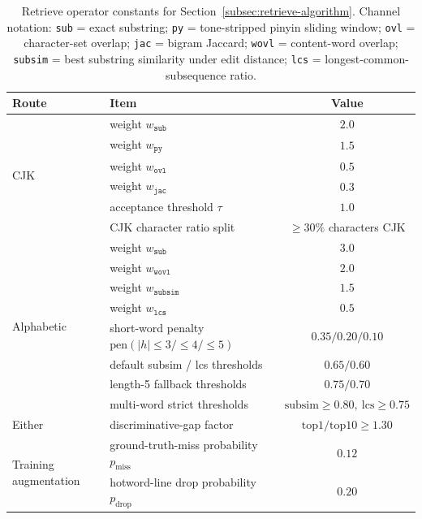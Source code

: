 \begin{table}[ht]
  \caption{Retrieve operator constants for
    Section~\ref{subsec:retrieve-algorithm}.
    Channel notation: \texttt{sub} = exact substring;
    \texttt{py} = tone-stripped pinyin sliding window;
    \texttt{ovl} = character-set overlap;
    \texttt{jac} = bigram Jaccard;
    \texttt{wovl} = content-word overlap;
    \texttt{subsim} = best substring similarity under edit distance;
    \texttt{lcs} = longest-common-subsequence ratio.}
  \label{tab:retrieve_constants}
  \centering
  \small
  \begin{tabular}{llc}
    \toprule
    Route & Item & Value \\
    \midrule
    \multirow{6}{*}{CJK}
       & weight $w_{\texttt{sub}}$            & $2.0$ \\
       & weight $w_{\texttt{py}}$             & $1.5$ \\
       & weight $w_{\texttt{ovl}}$            & $0.5$ \\
       & weight $w_{\texttt{jac}}$            & $0.3$ \\
       & acceptance threshold $\tau$          & $1.0$ \\
       & CJK character ratio split            & $\ge 30\%$ characters CJK \\
    \midrule
    \multirow{8}{*}{Alphabetic}
       & weight $w_{\texttt{sub}}$            & $3.0$ \\
       & weight $w_{\texttt{wovl}}$           & $2.0$ \\
       & weight $w_{\texttt{subsim}}$         & $1.5$ \\
       & weight $w_{\texttt{lcs}}$            & $0.5$ \\
       & short-word penalty $\mathrm{pen}(|h|\!\le\!3 / \le\!4 / \le\!5)$ & $0.35 / 0.20 / 0.10$ \\
       & default subsim / lcs thresholds       & $0.65 / 0.60$ \\
       & length-5 fallback thresholds          & $0.75 / 0.70$ \\
       & multi-word strict thresholds          & $\mathrm{subsim}\ge 0.80,\ \mathrm{lcs}\ge 0.75$ \\
    \midrule
    Either & discriminative-gap factor       & $\mathrm{top1}/\mathrm{top10} \ge 1.30$ \\
    \midrule
    \multirow{2}{*}{Training augmentation}
       & ground-truth-miss probability $p_\mathrm{miss}$ & $0.12$ \\
       & hotword-line drop probability $p_\mathrm{drop}$ & $0.20$ \\
    \bottomrule
  \end{tabular}
\end{table}

